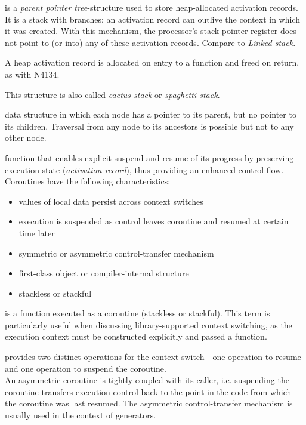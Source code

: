is a \emph{parent pointer tree}-structure used to store heap-allocated
activation records. It is a stack with branches; an activation record can
outlive the context in which it was created. With this mechanism, the
processor's stack pointer register does not point to (or into) any of these
activation records. Compare to \emph{Linked stack}.

A heap activation record is allocated on entry to a function and freed on
return, as with N4134\cite{N4134}.

This structure is also called \emph{cactus stack}\cite{cactusstack}
or \emph{spaghetti stack}.

data structure in which each node has a pointer to its parent, but no pointer to
its children. Traversal from any node to its ancestors is possible but not to
any other node.

function that enables explicit suspend and resume of its progress by
preserving execution state (\emph{activation record}), thus providing an
enhanced control flow. Coroutines have the following characteristics\cite{N3985}:
\begin{itemize}
    \item values of local data persist across context switches
    \item execution is suspended as control leaves coroutine and resumed at
          certain time later
    \item symmetric or asymmetric control-transfer mechanism
    \item first-class object or compiler-internal structure
    \item stackless or stackful
\end{itemize}

is a function executed as a coroutine (stackless or stackful). This term is
particularly useful when discussing library-supported context switching, as
the execution context must be constructed explicitly and passed a function.

provides two distinct operations for the context switch - one operation to
resume and one operation to suspend the coroutine.\\
An asymmetric coroutine is tightly coupled with its caller, i.e. suspending
the coroutine transfers execution control back to the point in the code
from which the coroutine was last resumed. The asymmetric control-transfer
mechanism is usually used in the context of generators.

